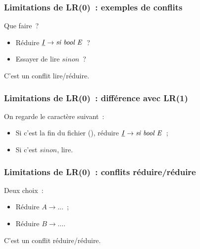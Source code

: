 \begin{frame}
    \frametitle{Limitations de LR(0)~: exemples de conflits}

    \begin{center}
        
    \end{center}

    Que faire~?
    \pause
    \begin{itemize}
        \item Réduire $\underline{I} \to \text{\textit{si bool E}}$~?
        \pause
        \item Essayer de lire $sinon$~?
    \end{itemize}

    \pause
    C’est un conflit lire/réduire.
\end{frame}
\addtocounter{framenumber}{-1}

\begin{frame}
    \frametitle{Limitations de LR(0)~: différence avec LR(1)}

    \begin{center}
        
    \end{center}

    \pause
    On regarde le caractère suivant~:
    \pause
    \begin{itemize}
        \item Si c’est la fin du fichier (\lozenge), réduire
            $\underline{I} \to \text{\textit{si bool E}}$~;
        \pause
        \item Si c’est $sinon$, lire.
    \end{itemize}
\end{frame}
\addtocounter{framenumber}{-1}

\begin{frame}
    \frametitle{Limitations de LR(0)~: conflits réduire/réduire}

    \begin{center}
        
    \end{center}

    Deux choix~:
    \pause
    \begin{itemize}
        \item Réduire $A \to \dots$~;
        \pause
        \item Réduire $B \to \dots$.
    \end{itemize}

    \pause
    C’est un conflit réduire/réduire.
\end{frame}
\addtocounter{framenumber}{-1}

